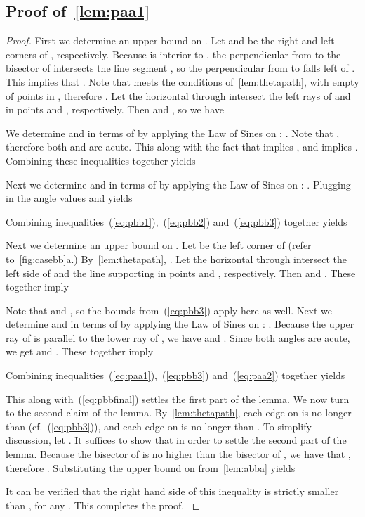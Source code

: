 \documentclass[runningheads,a4paper]{llncs}
\newcommand{\ABox}{
\raisebox{3pt}{\framebox[6pt]{\rule{6pt}{0pt}}}
}
\begin{document}
\subsection{Proof of~\autoref{lem:paa1}}
\aalemma*
\begin{proof}
First we determine an upper bound on . Let  and  be the right and left corners of , respectively. Because  is interior to , the perpendicular from  to the bisector of  intersects the line segment , so  the perpendicular from  to  falls left of . This implies that . 
Note that  meets the conditions of~\autoref{lem:thetapath}, with  empty of points in , therefore   
. 
Let the horizontal through  intersect the left rays of  and  in points  and , respectively. 
Then  and , so we have 

We determine  and  in terms of  by applying the Law of Sines on : 
. Note that ,  therefore both  and 
 are acute.  This along with the fact that  implies , and 
  implies . Combining these inequalities together yields

Next we determine  and  in terms of  by applying the Law of Sines on : 
. Plugging in the angle values 
 and  yields 

Combining inequalities~(\ref{eq:pbb1}),~(\ref{eq:pbb2}) and~(\ref{eq:pbb3}) together yields 

Next we determine an upper bound on .
Let  be the left corner of  (refer to~\autoref{fig:casebb}a.) By~\autoref{lem:thetapath}, .  
Let the horizontal through  intersect the left side of  and the line supporting  in points  and , respectively. Then  and . These together imply  

Note that  and , so the bounds from~(\ref{eq:pbb3}) apply here as well. 
Next we determine  and  in terms of  by applying the Law of Sines on : 
. Because the upper ray of 
 is parallel to the lower ray of ,  we have 
 and . 
Since both angles are acute, we get  
 and . These together imply 

Combining inequalities~(\ref{eq:paa1}),~(\ref{eq:pbb3}) and~(\ref{eq:paa2}) together yields 

This along with~(\ref{eq:pbbfinal}) settles the first part of the lemma. 
We now turn to the second claim of the lemma. By~\autoref{lem:thetapath}, each edge on 
 is no longer than  (cf.~(\ref{eq:pbb3})), and  
each edge on  is no longer than . 
To simplify discussion, let . 
It suffices to show that  in order to settle the second part of the lemma. 
Because the bisector of  is no higher than the bisector of , we have that , therefore . Substituting the upper bound on  from~\autoref{lem:abba} yields 

 It can be verified that the right hand side of this inequality is strictly smaller than , for any . This completes the proof.
{\hfill\ABox}\end{proof}
\end{document}

